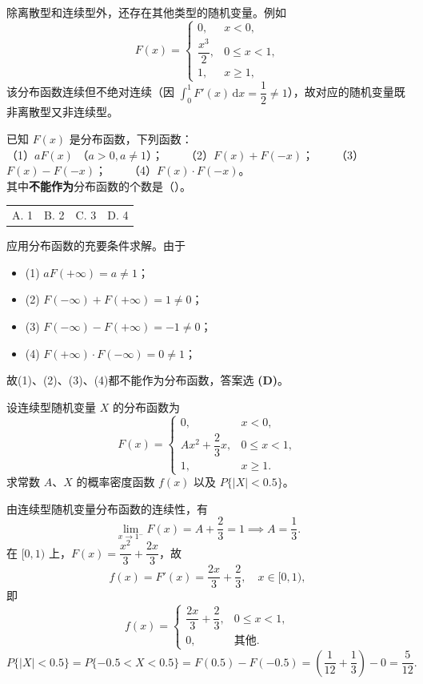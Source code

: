 \documentclass[lang=cn,11pt]{elegantbook}
\begin{document}
\begin{note}
除离散型和连续型外，还存在其他类型的随机变量。例如
\[
F(x) = \begin{cases}
0, & x < 0, \\
\dfrac{x^3}{2}, & 0 \le x < 1, \\
1, & x \ge 1,
\end{cases}
\]
该分布函数连续但不绝对连续（因 $\int_0^1 F'(x)\,\mathrm{d}x = \dfrac{1}{2} \neq 1$），故对应的随机变量既非离散型又非连续型。
\end{note}

\begin{exercise}[分布函数性质判断] \label{exer:2-32}
已知 $F(x)$ 是分布函数，下列函数：\\
（1）$aF(x)$ （$a>0, a\neq1$）；~~~~（2）$F(x)+F(-x)$；~~~~（3）$F(x)-F(-x)$；~~~~（4）$F(x)\cdot F(-x)$。\\
其中\textbf{不能作为}分布函数的个数是（\quad）。
\begin{tabular}{llll}
A. 1 & B. 2 & C. 3 & D. 4
\end{tabular}
\end{exercise}
\begin{solution}
应用分布函数的充要条件求解。由于
\begin{itemize}
    \item (1) $aF(+\infty)=a\neq1$；
    \item (2) $F(-\infty)+F(+\infty)=1\neq0$；
    \item (3) $F(-\infty)-F(+\infty)=-1\neq0$；
    \item (4) $F(+\infty)\cdot F(-\infty)=0\neq1$；
\end{itemize}
故(1)、(2)、(3)、(4)都不能作为分布函数，答案选 \textbf{(D)}。
\end{solution}


\begin{exercise}\label{exer:2-4}
设连续型随机变量 $X$ 的分布函数为
\[
F(x) = \begin{cases}
0, & x < 0, \\
Ax^2 + \dfrac{2}{3}x, & 0 \le x < 1, \\
1, & x \ge 1.
\end{cases}
\]
求常数 $A$、$X$ 的概率密度函数 $f(x)$ 以及 $P\{|X| < 0.5\}$。
\end{exercise}

\begin{solution}
由连续型随机变量分布函数的连续性，有
\[
\lim_{x \to 1^-} F(x) = A + \frac{2}{3} = 1 \implies A = \frac{1}{3}.
\]
在 $[0,1)$ 上，$F(x) = \dfrac{x^2}{3} + \dfrac{2x}{3}$，故
\[
f(x) = F'(x) = \frac{2x}{3} + \frac{2}{3}, \quad x \in [0,1),
\]
即
\[
f(x) = \begin{cases}
\dfrac{2x}{3} + \dfrac{2}{3}, & 0 \le x < 1, \\
0, & \text{其他}.
\end{cases}
\]
\[
P\{|X| < 0.5\} = P\{-0.5 < X < 0.5\} = F(0.5) - F(-0.5) = \left(\frac{1}{12} + \frac{1}{3}\right) - 0 = \frac{5}{12}.
\]
\end{solution}
\end{document}
